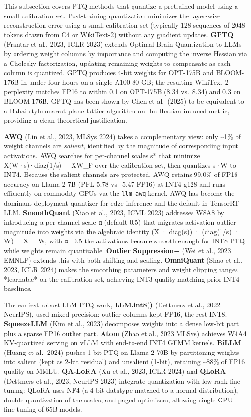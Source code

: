 This subsection covers PTQ methods that quantize a pretrained model using a small calibration set. Post-training quantization minimizes the layer-wise reconstruction error using a small calibration set (typically 128 sequences of 2048 tokens drawn from C4 or WikiText-2) without any gradient updates. \textbf{GPTQ} (Frantar et al., 2023, ICLR 2023) extends Optimal Brain Quantization to LLMs by ordering weight columns by importance and computing the inverse Hessian via a Cholesky factorization, updating remaining weights to compensate as each column is quantized. GPTQ produces 4-bit weights for OPT-175B and BLOOM-176B in under four hours on a single A100 80 GB; the resulting WikiText-2 perplexity matches FP16 to within 0.1 on OPT-175B (8.34 vs.~8.34) and 0.3 on BLOOM-176B. GPTQ has been shown by Chen et al.~(2025) to be equivalent to a Babai-style nearest-plane lattice algorithm on the Hessian-induced metric, providing a clean theoretical justification.

\textbf{AWQ} (Lin et al., 2023, MLSys 2024) takes a complementary view: only \textasciitilde1\% of weight channels are \emph{salient}, identified by the magnitude of corresponding input activations. AWQ searches for per-channel scales s* that minimize \textbar\textbar X(W·s)·diag(1/s) − XW\textbar\textbar\_F over the calibration set, then quantizes s·W to INT4. Because the salient channels are protected, AWQ retains 99.0\% of FP16 accuracy on Llama-2-7B (PPL 5.78 vs.~5.47 FP16) at INT4-g128 and runs efficiently on commodity GPUs via the \texttt{llm-awq} kernel. AWQ has become the dominant deployment quantizer for edge inference and the default in TensorRT-LLM. \textbf{SmoothQuant} (Xiao et al., 2023, ICML 2023) addresses W8A8 by introducing a per-channel scale α (default 0.5) that migrates activation outlier magnitude into weights via the algebraic identity (X · diag(s)) · (diag(1/s) · W) = X · W; with α=0.5 the activations become smooth enough for INT8 PTQ while weights remain quantizable. \textbf{Outlier Suppression+} (Wei et al., 2023 EMNLP) extends this with both shifting and scaling. \textbf{OmniQuant} (Shao et al., 2023, ICLR 2024) makes the smoothing parameters and weight clipping ranges *learnable* on the calibration set, achieving INT3 quality matching prior INT4 baselines.

The earliest robust LLM PTQ work, \textbf{LLM.int8()} (Dettmers et al., 2022 NeurIPS), used mixed-precision: outlier columns kept FP16, the rest INT8. \textbf{SqueezeLLM} (Kim et al., 2023) decomposes weights into a dense low-bit part plus a sparse FP16 outlier part. \textbf{Atom} (Zhao et al., 2023 MLSys) achieves W4A4 KV-quantized serving on vLLM with end-to-end INT4 GEMM kernels. \textbf{BiLLM} (Huang et al., 2024) pushes 1-bit PTQ on Llama-2-70B by partitioning weights into salient (kept as 2-bit residual) and unsalient (1-bit), retaining \textasciitilde88\% of FP16 quality on MMLU. \textbf{QA-LoRA} (Xu et al., 2023, ICLR 2024) and \textbf{QLoRA} (Dettmers et al., 2023, NeurIPS 2023) integrate quantization with low-rank fine-tuning: QLoRA uses NF4 (a 4-bit datatype matched to a normal distribution), double quantization of the scales, and paged optimizers, allowing single-GPU fine-tuning of 65B models.


